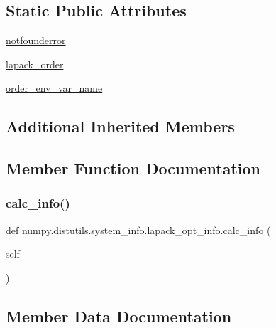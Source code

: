 \subsection*{Static Public Attributes}
\begin{DoxyCompactItemize}
\item 
\hyperlink{classnumpy_1_1distutils_1_1system__info_1_1lapack__opt__info_ab7549bd6ef452c697ae3d18b439714cb}{notfounderror}
\item 
\hyperlink{classnumpy_1_1distutils_1_1system__info_1_1lapack__opt__info_aace7df1c99c56461fcc5ee5a82f52df8}{lapack\+\_\+order}
\item 
\hyperlink{classnumpy_1_1distutils_1_1system__info_1_1lapack__opt__info_a895c9d8b6c037aa58932bbaabe64a7f6}{order\+\_\+env\+\_\+var\+\_\+name}
\end{DoxyCompactItemize}
\subsection*{Additional Inherited Members}


\subsection{Member Function Documentation}
\mbox{\label{classnumpy_1_1distutils_1_1system__info_1_1lapack__opt__info_afa68afa3bd34080125b37b226f563443}} 
\subsubsection{\texorpdfstring{calc\+\_\+info()}{calc\_info()}}
{\footnotesize\ttfamily def numpy.\+distutils.\+system\+\_\+info.\+lapack\+\_\+opt\+\_\+info.\+calc\+\_\+info (\begin{DoxyParamCaption}\item[{}]{self }\end{DoxyParamCaption})}



\subsection{Member Data Documentation}
\mbox{\label{classnumpy_1_1distutils_1_1system__info_1_1lapack__opt__info_aace7df1c99c56461fcc5ee5a82f52df8}} 
